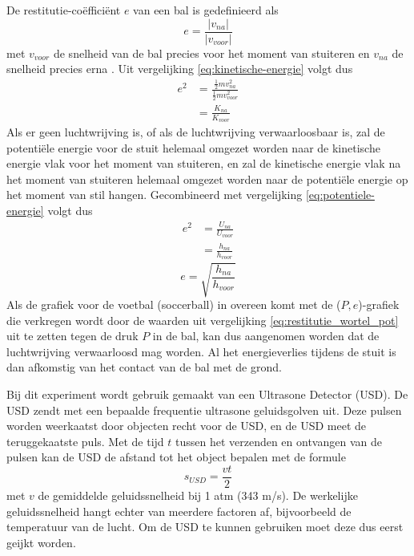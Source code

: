 \documentclass[11pt,a4paper]{article}
\begin{document}
De restitutie-coëfficiënt $e$ van een bal is gedefinieerd als
\begin{equation}
e = \frac{\left|v_{na}\right|}{\left|v_{voor}\right|}
\label{eq:restitutie}
\end{equation}
met $v_{voor}$ de snelheid van de bal precies voor het moment van stuiteren en $v_{na}$ de snelheid precies erna \cite{georgallas_landry_2016}. Uit vergelijking \ref{eq:kinetische-energie} volgt dus
\begin{equation}
\begin{align*}
e^2 &= \frac{\frac{1}{2}mv_{na}^2}{\frac{1}{2}mv_{voor}^2}\\
&= \frac{K_{na}}{K_{voor}}
\label{eq:restitutie_kinetisch}
\end{align*}
\end{equation}
Als er geen luchtwrijving is, of als de luchtwrijving verwaarloosbaar is, zal de potentiële energie voor de stuit helemaal omgezet worden naar de kinetische energie vlak voor het moment van stuiteren, en zal de kinetische energie vlak na het moment van stuiteren helemaal omgezet worden naar de potentiële energie op het moment van stil hangen. Gecombineerd met vergelijking \ref{eq:potentiele-energie} volgt dus
\begin{equation}
\begin{align*}
e^2 &= \frac{U_{na}}{U_{voor}}\\
&= \frac{h_{na}}{h_{voor}}
\label{eq:restitutie_potentieel}
\end{align*}
\end{equation}
\begin{equation}
e = \sqrt{\frac{h_{na}}{h_{voor}}}
\label{eq:restitutie_wortel_pot}
\end{equation}
Als de grafiek voor de voetbal (soccerball) in \cite{georgallas_landry_2016} overeen komt met de ($P,e$)-grafiek die verkregen wordt door de waarden uit vergelijking \ref{eq:restitutie_wortel_pot} uit te zetten tegen de druk $P$ in de bal, kan dus aangenomen worden dat de luchtwrijving verwaarloosd mag worden. Al het energieverlies tijdens de stuit is dan afkomstig van het contact van de bal met de grond.

Bij dit experiment wordt gebruik gemaakt van een Ultrasone Detector (USD). De USD zendt met een bepaalde frequentie ultrasone geluidsgolven uit. Deze pulsen worden weerkaatst door objecten recht voor de USD, en de USD meet de teruggekaatste puls. Met de tijd $t$ tussen het verzenden en ontvangen van de pulsen kan de USD de afstand tot het object bepalen met de formule
\begin{equation}
s_{USD} = \frac{vt}{2}
\end{equation}
met $v$ de gemiddelde geluidssnelheid bij 1 atm (343 m/s). De werkelijke geluidssnelheid hangt echter van meerdere factoren af, bijvoorbeeld de temperatuur van de lucht. Om de USD te kunnen gebruiken moet deze dus eerst geijkt worden.
\end{document}
